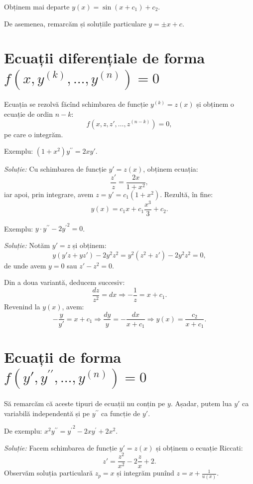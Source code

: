 \documentclass[11pt,a4paper]{article}
\theoremstyle{dotless}
\theoremstyle{dotlessdr}
\begin{document}
Obținem mai departe $y(x) = \sin (x + c_1) + c_2$.

De asemenea, remarcăm și soluțiile particulare $y = \pm x + c$.


\section{Ecuații diferențiale de forma $f(x, y^{(k)}, \dots, y^{(n)}) = 0$}

Ecuația se rezolvă făcînd schimbarea de funcție $y^{(k)} = z(x)$ și obținem
o ecuație de ordin $n - k$:
\[
  f(x, z, z', \dots, z^{(n-k)}) = 0,
\]
pe care o integrăm.

Exemplu: $(1 + x^2)y^{\prime \prime} = 2xy'$.

\emph{Soluție:} Cu schimbarea de funcție $y' = z(x)$, obținem ecuația:
\[
  \frac{z'}{z} = \frac{2x}{1 + x^2},
\]
iar apoi, prin integrare, avem $z = y' = c_1(1 + x^2)$. Rezultă, în fine:
\[
  y(x) = c_1 x + c_1 \frac{x^3}{3} + c_2.
\]

\vspace{1cm}

Exemplu: $y \cdot y^{\prime \prime} - 2{y^\prime}^2 = 0$.

\emph{Soluție:} Notăm $y' = z$ și obținem:
\[
  y(y' z + yz') - 2y^2 z^2 = y^2(z^2 + z') - 2y^2z^2 = 0,
\]
de unde avem $y = 0$ sau $z' - z^2 = 0$.

Din a doua variantă, deducem succesiv:
\[
  \frac{dz}{z^2} = dx \Rightarrow -\frac{1}{z} = x + c_1.
\]
Revenind la $y(x)$, avem:
\[
  -\frac{y}{y'} = x + c_1 \Rightarrow \frac{dy}{y} = -\frac{dx}{x + c_1} \Rightarrow %
  y(x) = \frac{c_2}{x + c_1}.
\]


\section{Ecuații de forma $f(y', y^{\prime\prime}, \dots, y^{(n)}) = 0$}

Să remarcăm că aceste tipuri de ecuații nu conțin pe $y$. Așadar, putem lua $y'$
ca variabilă independentă și pe $y^{\prime\prime}$ ca funcție de $y'$.

De exemplu: $x^2 y^{\prime\prime} = {y^\prime}^2 - 2xy^\prime + 2x^2$.

\emph{Soluție:} Facem schimbarea de funcție $y' = z(x)$ și obținem o ecuație
Riccati:
\[
  z' = \frac{z^2}{x^2} - 2\frac{z}{x} + 2.
\]
Observăm soluția particulară $z_p = x$ și integrăm punînd $z = x + \frac{1}{u(x)}$.
\end{document}
